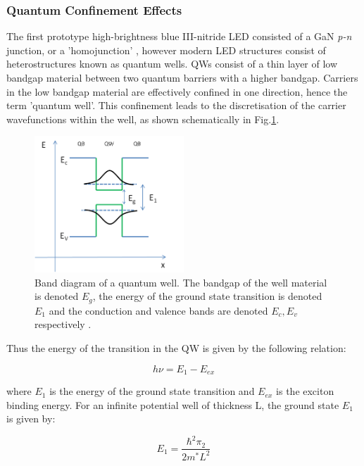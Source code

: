 \subsubsection{Quantum Confinement Effects}

The first prototype high-brightness blue III-nitride LED consisted of a GaN {\it p-n} junction, or a 'homojunction' \cite{Nakamura1991}, however modern LED structures consist of heterostructures known as quantum wells. QWs consist of a thin layer of low bandgap material between two quantum barriers with a higher bandgap. Carriers in the low bandgap material are effectively confined in one direction, hence the term 'quantum well'. This confinement leads to the discretisation of the carrier wavefunctions within the well, as shown schematically in Fig.\ref{QW}.

\begin{figure}[h]
	\centering
	\includegraphics[width=0.5\textwidth, trim = 4 4 4 4 , clip]{Figs/Ch1/BandstructureQW.png}
	\caption {Band diagram of a quantum well. The bandgap of the well material is denoted $E_{g}$, the energy of the ground state transition is denoted $E_{1}$ and the conduction and valence bands are denoted $E_{c},E_{v}$ respectively \cite{Ren2015}.}
	\label{QW}
\end{figure}
\FloatBarrier

Thus the energy of the transition in the QW is given by the following relation:

\begin{equation}
h\nu = E_{1}-E_{ex}
\end{equation}

where $E_{1}$ is the energy of the ground state transition and $E_{ex}$ is the exciton binding energy. For an infinite potential well of thickness L, the ground state $E_{1}$ is given by:

\begin{equation}
E_{1}=\frac{\hbar^{2}\pi_{2}}{2m^{*}L^{2}}
\end{equation}

